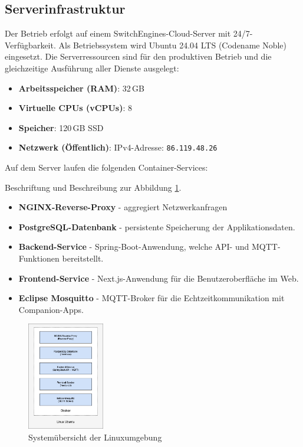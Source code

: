 \documentclass[12pt,a4paper]{report}
\begin{document}
    \subsection{Serverinfrastruktur}

        Der Betrieb erfolgt auf einem SwitchEngines-Cloud-Server mit 24/7-Verfügbarkeit.
        Als Betriebssystem wird Ubuntu 24.04 LTS (Codename Noble) eingesetzt.
        Die Serverressourcen sind für den produktiven Betrieb und die gleichzeitige Ausführung aller Dienste ausgelegt:

        \begin{itemize}
            \item \textbf{Arbeitsspeicher (RAM)}: 32\,GB
            \item \textbf{Virtuelle CPUs (vCPUs)}: 8
            \item \textbf{Speicher}: 120\,GB SSD
            \item \textbf{Netzwerk (Öffentlich)}: IPv4-Adresse: \texttt{86.119.48.26}
        \end{itemize}

        Auf dem Server laufen die folgenden Container-Services:

        Beschriftung und Beschreibung zur Abbildung \ref{fig:deployment-system}.
        \begin{itemize}
            \item \textbf{NGINX-Reverse-Proxy} - aggregiert Netzwerkanfragen
            \item \textbf{PostgreSQL-Datenbank} - persistente Speicherung der Applikationsdaten.
            \item \textbf{Backend-Service} - Spring-Boot-Anwendung, welche API- und MQTT-Funktionen bereitstellt.
            \item \textbf{Frontend-Service} - Next.js-Anwendung für die Benutzeroberfläche im Web.
            \item \textbf{Eclipse Mosquitto} - MQTT-Broker für die Echtzeitkommunikation mit Companion-Apps.
        \end{itemize}

        \begin{figure}[H]
          \centering
          \includegraphics[width=0.3\textwidth]{../figures/deployment-system.drawio.png}
          \caption{Systemübersicht der Linuxumgebung}
          \label{fig:deployment-system}
        \end{figure}
\end{document}
